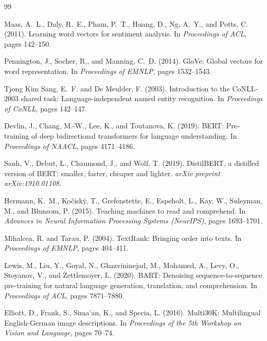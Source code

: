 \documentclass[12pt,a4paper]{article}
\begin{document}

\begin{thebibliography}{99}

Maas, A.~L., Daly, R.~E., Pham, P.~T., Huang, D., Ng, A.~Y., and Potts, C. (2011).
\newblock Learning word vectors for sentiment analysis.
\newblock In \textit{Proceedings of ACL}, pages 142--150.

Pennington, J., Socher, R., and Manning, C.~D. (2014).
\newblock GloVe: Global vectors for word representation.
\newblock In \textit{Proceedings of EMNLP}, pages 1532--1543.

Tjong Kim Sang, E.~F. and De Meulder, F. (2003).
\newblock Introduction to the CoNLL-2003 shared task: Language-independent named entity recognition.
\newblock In \textit{Proceedings of CoNLL}, pages 142--147.

Devlin, J., Chang, M.-W., Lee, K., and Toutanova, K. (2019).
\newblock BERT: Pre-training of deep bidirectional transformers for language understanding.
\newblock In \textit{Proceedings of NAACL}, pages 4171--4186.

Sanh, V., Debut, L., Chaumond, J., and Wolf, T. (2019).
\newblock DistilBERT, a distilled version of BERT: smaller, faster, cheaper and lighter.
\newblock \textit{arXiv preprint arXiv:1910.01108}.

Hermann, K.~M., Kočiský, T., Grefenstette, E., Espeholt, L., Kay, W., Suleyman, M., and Blunsom, P. (2015).
\newblock Teaching machines to read and comprehend.
\newblock In \textit{Advances in Neural Information Processing Systems (NeurIPS)}, pages 1693--1701.

Mihalcea, R. and Tarau, P. (2004).
\newblock TextRank: Bringing order into texts.
\newblock In \textit{Proceedings of EMNLP}, pages 404--411.

Lewis, M., Liu, Y., Goyal, N., Ghazvininejad, M., Mohamed, A., Levy, O., Stoyanov, V., and Zettlemoyer, L. (2020).
\newblock BART: Denoising sequence-to-sequence pre-training for natural language generation, translation, and comprehension.
\newblock In \textit{Proceedings of ACL}, pages 7871--7880.

Elliott, D., Frank, S., Sima'an, K., and Specia, L. (2016).
\newblock Multi30K: Multilingual English-German image descriptions.
\newblock In \textit{Proceedings of the 5th Workshop on Vision and Language}, pages 70--74.


\end{thebibliography}
\end{document}
